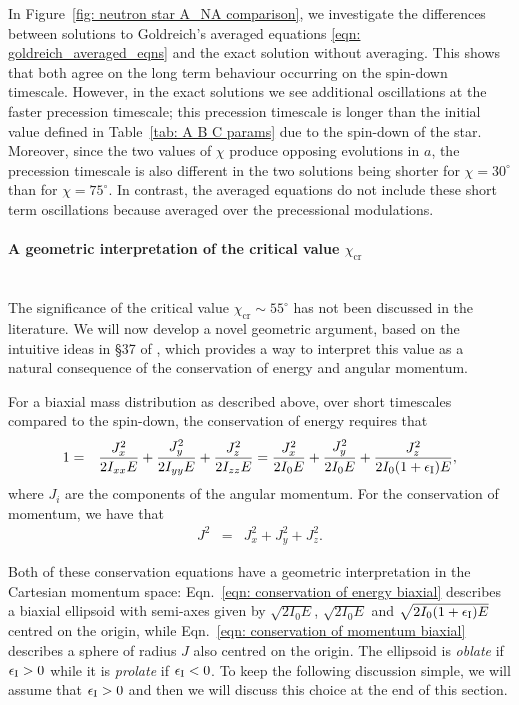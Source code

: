 \documentclass[../full_thesis/full_thesis.tex]{subfiles}
\begin{document}
In Figure~\ref{fig: neutron star A_NA comparison}, we investigate the
differences between solutions to Goldreich's averaged equations \eqref{eqn:
goldreich_averaged_eqns} and the exact solution without averaging.  This shows
that both agree on the long term behaviour occurring on the spin-down
timescale. However, in the exact solutions we see additional oscillations at
the faster precession timescale; this precession timescale is longer than the
initial value defined in Table~\ref{tab: A B C params} due to the spin-down of
the star. Moreover, since the two values of $\chi$ produce opposing evolutions
in $a$, the precession timescale is also different in the two solutions being
shorter for $\chi=30^{\circ}$ than for $\chi=75^{\circ}$. In contrast, the
averaged equations do not include these short term oscillations because
\citeauthor{Goldreich1970} averaged over the precessional modulations.

\paragraph{A geometric interpretation of the critical value $\chi_\textrm{cr}$}\mbox{}\\
The significance of the critical value $\chi_\textrm{cr} \sim 55^{\circ}$
has not been discussed in the literature. We will now develop a novel
geometric argument, based on the intuitive ideas in \S 37 of \citet{Landau1969},
which provides a way to interpret this value as a natural
consequence of the conservation of energy and angular momentum.

For a biaxial mass distribution as described above, over short timescales compared
to the spin-down, the conservation of energy requires that
\begin{eqnarray}
1 & = & \frac{J_{x}^{2}}{2I_{xx}E}+\frac{J_{y}^{2}}{2I_{yy}E}+\frac{J_{z}^{2}}{2I_{zz}E}
=\frac{J_{x}^{2}}{2I_{0}E}+\frac{J_{y}^{2}}{2I_{0}E}+\frac{J_{z}^{2}}{2I_{0}(1+\epsilon_{\mathrm{I}})E},
\label{eqn: conservation of energy biaxial}
\end{eqnarray}
where $J_i$ are the components of the angular momentum. For the conservation of
momentum, we have that
\begin{eqnarray}
J^{2} & = & J_{x}^{2}+J_{y}^{2}+J_{z}^{2}.
\label{eqn: conservation of momentum biaxial}
\end{eqnarray}

Both of these conservation equations have a geometric interpretation in the
Cartesian momentum space: Eqn.~\eqref{eqn: conservation of energy biaxial}
describes a biaxial ellipsoid with semi-axes given by $\sqrt{2I_{0}E}$,
$\sqrt{2I_{0}E}$ and $\sqrt{2I_{0}(1+\epsilon_{\mathrm{I}})E}$ centred on the origin,
while Eqn.~\eqref{eqn: conservation of momentum biaxial} describes a sphere of
radius $J$ also centred on the origin. The ellipsoid is \emph{oblate} if $\epsilon_{\mathrm{I}}
> 0$ while it is \emph{prolate} if $\epsilon_{\mathrm{I}} < 0$. To keep the following discussion
simple, we will assume that $\epsilon_{\mathrm{I}} > 0$ and then we will discuss this choice at
the end of this section.
\end{document}
